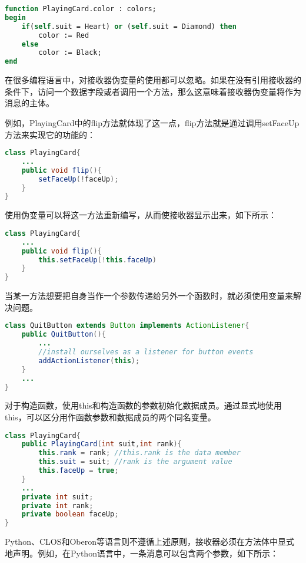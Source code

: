 \begin{lstlisting}[language=Pascal]
function PlayingCard.color : colors;
begin
	if(self.suit = Heart) or (self.suit = Diamond) then
		color := Red
	else
		color := Black;
end
\end{lstlisting}

在很多编程语言中，对接收器伪变量的使用都可以忽略。如果在没有引用接收器的条件下，访问一个数据字段或者调用一个方法，那么这意味着接收器伪变量将作为消息的主体。

例如，PlayingCard中的flip方法就体现了这一点，flip方法就是通过调用setFaceUp方法来实现它的功能的：



\begin{lstlisting}[language=Java]
class PlayingCard{
	...
	public void flip(){
		setFaceUp(!faceUp);
	}
}
\end{lstlisting}

使用伪变量可以将这一方法重新编写，从而使接收器显示出来，如下所示：



\begin{lstlisting}[language=Java]
class PlayingCard{
	...
	public void flip(){
		this.setFaceUp(!this.faceUp)
	}
}
\end{lstlisting}

当某一方法想要把自身当作一个参数传递给另外一个函数时，就必须使用变量来解决问题。



\begin{lstlisting}[language=Java]
class QuitButton extends Button implements ActionListener{
	public QuitButton(){
		...
		//install ourselves as a listener for button events
		addActionListener(this);
	}
	...
}
\end{lstlisting}

对于构造函数，使用this和构造函数的参数初始化数据成员。通过显式地使用this，可以区分用作函数参数和数据成员的两个同名变量。


\begin{lstlisting}[language=Java]
class PlayingCard{
	public PlayingCard(int suit,int rank){
		this.rank = rank; //this.rank is the data member
		this.suit = suit; //rank is the argument value
		this.faceUp = true;
	}
	...
	private int suit;
	private int rank;
	private boolean faceUp;
}
\end{lstlisting}

Python、CLOS和Oberon等语言则不遵循上述原则，接收器必须在方法体中显式地声明。例如，在Python语言中，一条消息可以包含两个参数，如下所示：





